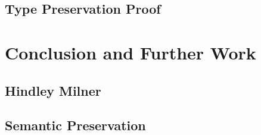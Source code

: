\documentclass[runningheads]{llncs}
\begin{document}
\subsection{Type Preservation Proof}
\section{Conclusion and Further Work}
\subsection{Hindley Milner}
\subsection{Semantic Preservation}

\begin{thebibliography}{8}



\end{thebibliography}
\end{document}
